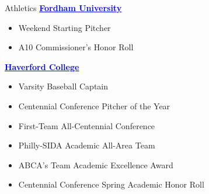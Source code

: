 \documentclass{resume3}
\begin{document}
\begin{rSection}{Athletics}
\vspace{0.15cm}
 \href{https://fordhamsports.com/sports/baseball/roster/mike-rabayda/14433}{\textcolor{blue}{\underline{{\bf {} Fordham University}}}} 
\begin{itemize}
\item Weekend Starting Pitcher
\item A10 Commissioner’s Honor Roll 
\end{itemize}


 \href{https://haverfordathletics.com/sports/baseball/roster/mike-rabayda/447}{\textcolor{blue}{\underline{{\bf {} Haverford College}}}} 
\begin{itemize}
\item Varsity Baseball Captain
\item Centennial Conference Pitcher of the Year
\item First-Team All-Centennial Conference
\item Philly-SIDA Academic All-Area Team 
\item ABCA's Team Academic Excellence Award
\item Centennial Conference Spring Academic Honor Roll
\end{itemize}

\end{rSection}
\end{document}
